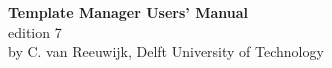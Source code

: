 \begin{titlepage}
\begin{center}
{\Huge \bf Template Manager Users' Manual} \\
\vspace{2mm}
{\Large edition 7} \\
\vspace{5mm}
{\Large by C. van Reeuwijk, Delft University of Technology}
\vspace{2cm}
\begin{center}

\end{center}
\end{center}
\end{titlepage}
